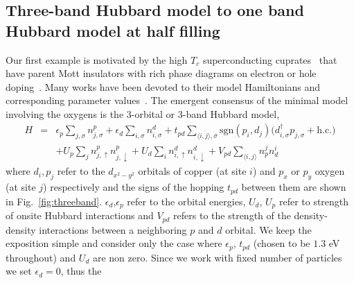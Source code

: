 \subsection{Three-band Hubbard model to one band Hubbard model at half filling}
Our first example is motivated by the high $T_c$ superconducting cuprates~\cite{Bednorz1986} that 
have parent Mott insulators with rich phase diagrams on electron or hole doping~\cite{Dagotto_RevModPhys, LeeWen_RevModPhys}. 
Many works have been devoted to their model Hamiltonians and corresponding parameter 
values~\cite{Emery, ZhangRice, tJSpalek, Hybertsen_PRB1989, Hybertsen_PRB1990, Pavirini, Kent_Hubbard}. 
The emergent consensus of the minimal model involving the oxygens is the 3-orbital or 3-band Hubbard model, 
\begin{eqnarray}
H &=&    \epsilon_p \sum_{j,\sigma} n^{p}_{j,\sigma} + \epsilon_{d} \sum_{i,\sigma}  n^{d}_{i,\sigma} 
	+ t_{pd} \sum_{\langle i,j \rangle, \sigma} \text{sgn}(p_i,d_j) \Big( d_{i,\sigma}^{\dagger} p_{j,\sigma} + \text{h.c.} \Big) \nonumber \\
  & &   + U_p \sum_{j} n^{p}_{j,\uparrow} n^{p}_{j,\downarrow} + U_d \sum_{i} n^{d}_{i,\uparrow} n^{d}_{i,\downarrow} + V_{pd} \sum_{\langle i,j \rangle} n^{j}_p n^{i}_d 
\end{eqnarray}
where $d_i,p_j$ refer to the  $d_{x^2 - y^2}$ orbitals of copper (at site $i$) and $p_x$ or $p_y$ 
oxygen (at site $j$)  respectively and the signs of the hopping $t_{pd}$ between them are shown in Fig.~\ref{fig:threeband}. 
$\epsilon_d$,$\epsilon_p$ refer to the orbital energies, 
$U_d$, $U_p$ refer to strength of onsite Hubbard interactions and $V_{pd}$ refers to the 
strength of the density-density interactions between a neighboring $p$ and $d$ orbital. 
We keep the exposition simple and consider only the case where $\epsilon_p$, $t_{pd}$ (chosen to be $1.3$ eV throughout) 
and $U_{d}$ are non zero. Since we work with fixed number of particles we set $\epsilon_d = 0$, thus the 
